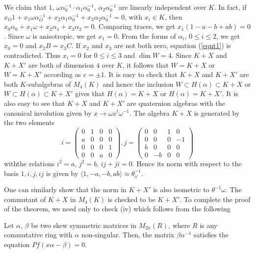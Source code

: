\begin{Proof}
We claim that $1$, $\omega \alpha^{-1}_0\cdot \alpha_1\alpha^{-1}_0$, $\alpha_2\alpha_0^{-1}$ are linearly independent over $K$. In fact, if $x_O1+x_1\omega \alpha^{-1}_O+x_2\alpha_1\alpha^{-1}_0+x_3\alpha_2\alpha_0^{-1}=0$, with $x_i\in K$, then $x_0\alpha_0+x_1\omega +x_2\alpha_1+x_3\alpha_2=0$. Comparing traces, we get $x_1(1-a-b+ab)=0$. Since $\omega$ is anisotropic, we get $x_1=0$. From the forms of $\alpha_i$, $0\leq i \leq 2$, we get $x_0=0$ and $x_2 B=x_3 C$. If $x_2$ and $x_3$ are not both zero, equation (\ref{eqnt1}) is contradicted. Thus $x_i=0$ for $0\leq i \leq 3$ and $\dim W=4$. Since $K+X$ and $K+X'$ are both of dimension $4$ over $K$, it follows that $W=K+X$ or $W=K+X'$ according as $e=\pm 1$. It is easy to check that $K+X$ and $K+X'$ are both $K$-subalgebras of $M_4(K)$ and hence the inclusion $W\subset H(\alpha)\subset K+X$ or $W\subset H(\alpha)\subset K+X'$ gives that $H(\alpha)=K+X$ or $H(\alpha)=K+X'$. It is also easy to see that $K+X$ and $K+X'$ are quaternion algebras with the canonical involution given by $x\to \omega x^{t}\omega^{-1}$. The algebra $K+X$ is generated by the two elements 
$$
i=
\begin{pmatrix}
0 & 1 & 0 & 0\\
a & 0 & 0 & 0\\
0 & 0 & 0 & 1\\
0 & 0 & a & 0
\end{pmatrix},j=\begin{pmatrix}
0 & 0 &1 & 0\\
0 & 0 & 0 & -1\\
b & 0 & 0 & 0\\
0 & -b & 0 & 0
\end{pmatrix}
$$
with\pageoriginale the relations $i^{2}=a$, $j^{2}=b$, $ij+ji=0$. Hence its norm with respect to the basis $1, i, j, ij$ is given by $\langle 1, -a, -b, ab\rangle \approx \theta^{-1}_{\omega}$. 

One can similarly show that the norm in $K+X'$ is also isometric to $\theta^{-1}\omega$. The commutant of $K+X$ in $M_4(K)$ is checked to be $K+X'$. To complete the proof of the theorem, we need only to check (iv) which follows from the following 
\end{Proof}

\begin{lem}\label{lem3.5}
Let $\alpha$, $\beta$ be two skew symmetric matrices in $M_{2 n}(R)$, where $R$ is any commutative ring with $\alpha$ non-singular. Then, the matrix $\beta \alpha^{-1}$ satisfies the equation $Pf(x\alpha-\beta)=0$. 
\end{lem}

